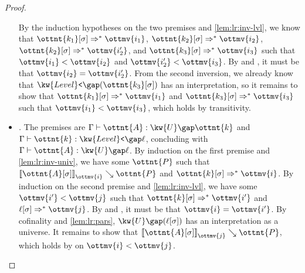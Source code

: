 \documentclass[a4paper,UKenglish,cleveref,autoref,thm-restate]{lipics-v2021}
\begin{document}
\begin{proof}
\begin{itemize}[topsep=0pt]
      By the induction hypotheses on the two premises and \cref{lem:lr:inv-lvl},
      we know that $  \ottnt{k_{{\mathrm{1}}}} [  \sigma  ]   \Rightarrow^\ast   \ottmv{i_{{\mathrm{1}}}}  $, $  \ottnt{k_{{\mathrm{2}}}} [  \sigma  ]   \Rightarrow^\ast   \ottmv{i_{{\mathrm{2}}}}  $, $  \ottnt{k_{{\mathrm{2}}}} [  \sigma  ]   \Rightarrow^\ast   \ottmv{i'_{{\mathrm{2}}}}  $, and $  \ottnt{k_{{\mathrm{3}}}} [  \sigma  ]   \Rightarrow^\ast   \ottmv{i_{{\mathrm{3}}}}  $
      such that $ \ottmv{i_{{\mathrm{1}}}}  <  \ottmv{i_{{\mathrm{2}}}} $ and $ \ottmv{i'_{{\mathrm{2}}}}  <  \ottmv{i_{{\mathrm{3}}}} $.
      By  and ,
      it must be that $\ottmv{i_{{\mathrm{2}}}} = \ottmv{i'_{{\mathrm{2}}}}$.
      From the second inversion, we already know that $ \kw{Level}\texttt{<} \gap   (  \ottnt{k_{{\mathrm{3}}}} [  \sigma  ]  )  $ has an interpretation,
      so it remains to show that $  \ottnt{k_{{\mathrm{1}}}} [  \sigma  ]   \Rightarrow^\ast   \ottmv{i_{{\mathrm{1}}}}  $ and $  \ottnt{k_{{\mathrm{3}}}} [  \sigma  ]   \Rightarrow^\ast   \ottmv{i_{{\mathrm{3}}}}  $ such that $ \ottmv{i_{{\mathrm{1}}}}  <  \ottmv{i_{{\mathrm{3}}}} $,
      which holds by transitivity.
    \item \textit{.}
      The premises are $ \Gamma  \vdash  \ottnt{A}  \mathrel{:}   \kw{U} \gap  \ottnt{k}  $ and $ \Gamma  \vdash  \ottnt{k}  \mathrel{:}   \kw{Level}\texttt{<} \gap  \ell  $,
      concluding with $ \Gamma  \vdash  \ottnt{A}  \mathrel{:}   \kw{U} \gap  \ell  $.
      By induction on the first premise and \cref{lem:lr:inv-univ},
      we have some $\ottnt{P}$ such that $ \mathopen{\llbracket}   \ottnt{A} [  \sigma  ]   \mathclose{\rrbracket}_{ \ottmv{i} } \searrow  \ottnt{P} $ and $  \ottnt{k} [  \sigma  ]   \Rightarrow^\ast   \ottmv{i}  $.
      By induction on the second premise and \cref{lem:lr:inv-lvl},
      we have some $ \ottmv{i'}  <  \ottmv{j} $ such that $  \ottnt{k} [  \sigma  ]   \Rightarrow^\ast   \ottmv{i'}  $ and $  \ell [  \sigma  ]   \Rightarrow^\ast   \ottmv{j}  $.
      By  and ,
      it must be that $\ottmv{i} = \ottmv{i'}$.
      By cofinality and \cref{lem:lr:pars},
      $ \kw{U} \gap   (  \ell [  \sigma  ]  )  $ has an interpretation as a universe.
      It remains to show that $ \mathopen{\llbracket}   \ottnt{A} [  \sigma  ]   \mathclose{\rrbracket}_{ \ottmv{j} } \searrow  \ottnt{P} $,
      which holds by  on $ \ottmv{i}  <  \ottmv{j} $.
      \qedhere
  \end{itemize}
\end{proof}
\end{document}
